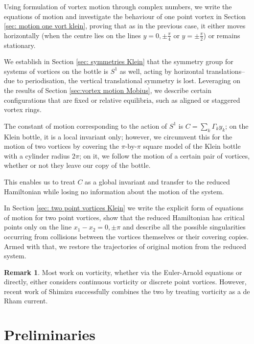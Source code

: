 \documentclass[11pt,twoside]{article}
\theoremstyle{definition}
\newtheorem{rem}[theorem]{Remark}
\numberwithin{equation}{section}
\begin{document}
Using formulation of vortex motion through complex numbers, we write the equations of motion and investigate the behaviour of one point vortex in Section \ref{sec: motion one vort klein}, proving that as in the previous case, it either moves horizontally (when the centre lies on the lines $y = 0, \pm\frac{\pi}{4}$ or $y=\pm\frac{\pi}{2}$) or remains stationary.


We establish in Section \ref{sec: symmetries Klein} that the symmetry group for systems of vortices on the bottle is $S^1$ as well, acting by horizontal translations-- due to periodisation, the vertical translational symmetry is lost. Leveraging on the results of Section \ref{sec:vortex motion Mobius}, we describe certain configurations that are fixed or relative equilibria, such as aligned or staggered vortex rings. 

The  constant of motion  corresponding to the action of $S^1$ is $C = \sum_k\Gamma_ky_k$; on the Klein bottle, it  is a local invariant only; however, we circumvent this for the motion of two vortices by covering the  $\pi$-by-$\pi$ square model of the Klein bottle with a cylinder  radius $2\pi$; on it, we follow the motion of a certain pair of vortices, whether or not they leave our copy of the bottle. 

This enables us to treat $C$ as a global  invariant and transfer to the reduced Hamiltonian  while losing no information about the motion of the system. 


In Section \ref{sec: two point vortices Klein} we write the explicit form of equations of motion for two point vortices, show that the reduced Hamiltonian has critical points only on the line $x_1-x_2 = 0,\pm\pi$ 
and describe all the possible singularities occurring from collisions between the vortices themselves or their covering copies. Armed with that, we  restore the trajectories of original motion from the reduced system. 



\begin{rem}
Most work on vorticity, whether via the Euler-Arnold equations or directly, either considers continuous vorticity or discrete point vortices. However, recent work of Shimizu \cite{Shimizu-currents} successfully combines the two by treating vorticity as a de Rham current. 
\end{rem}


  \section{Preliminaries}
\end{document}
